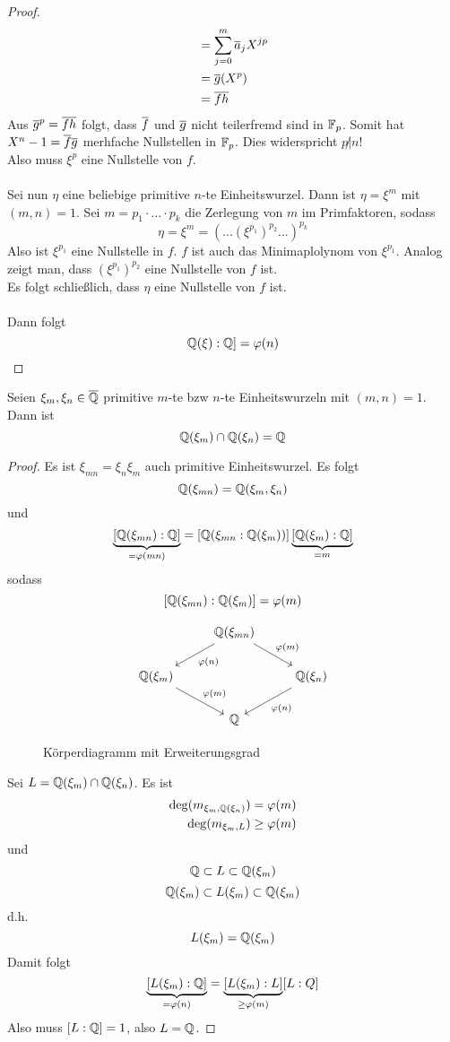 \begin{proof}
\begin{align*}
		&=\sum_{j=0}^{m}\overline{a}_jX^{jp}\\
		&=\overline{g}(X^p)\\
		&=\overline{f}\overline{h}
		\end{align*}
		Aus $\overline{g}^p=\overline{f} \overline{h}$ folgt, dass $\overline{f}$ und $\overline{g}$ nicht teilerfremd sind in $\mathbb{F}_p$. Somit hat $X^n-1=\overline{f}\overline{g}$ merhfache Nullstellen in $\mathbb{F}_p$. Dies widerspricht $p\not|n$!\\
		Also muss $\xi^p$ eine Nullstelle von $f$.\\
		\\
		Sei nun $\eta$ eine beliebige primitive $n$-te Einheitswurzel. Dann ist $\eta=\xi^m$ mit $(m,n)=1$. Sei $m=p_1\cdot...\cdot p_k$ die Zerlegung von $m$ im Primfaktoren, sodass
		\[\eta=\xi^m=(...(\xi^{p_1})^{p_2}...)^{p_k}\]
		Also ist $\xi^{p_1}$ eine Nullstelle in $f$. $f$ ist auch das Minimaplolynom von $\xi^{p_1}$. Analog zeigt man, dass $(\xi^{p_1})^{p_2}$ eine Nullstelle von $f$ ist.\\
		Es folgt schließlich, dass $\eta$ eine Nullstelle von $f$ ist.\\ 
		\\
		Dann folgt
		\[\mathbb{Q}(\xi):\mathbb{Q}]=\varphi(n)\]
	\end{proof}
	
	
	\begin{satz}
		Seien $\xi_m,\xi_n\in\overline{\mathbb{Q}}$ primitive $m$-te bzw $n$-te Einheitswurzeln mit $(m,n)=1$.\\
		Dann ist
		\[\mathbb{Q}(\xi_m)\cap \mathbb{Q}(\xi_n)=\mathbb{Q}\]
	\end{satz}
	\begin{proof}
		Es ist $\xi_{mn}=\xi_n\xi_m$ auch primitive Einheitswurzel. Es folgt
		\[\mathbb{Q}(\xi_{mn})=\mathbb{Q}(\xi_m,\xi_n)\]
		und
		\[\underbrace{[\mathbb{Q}(\xi_{mn}):\mathbb{Q}]}_{=\varphi(mn)}=[\mathbb{Q}(\xi_{mn}:\mathbb{Q}(\xi_m))]\underbrace{[\mathbb{Q}(\xi_m):\mathbb{Q}]}_{=m}\]
		sodass
		\[[\mathbb{Q}(\xi_{mn}):\mathbb{Q}(\xi_m)]=\varphi(m)\]
		\begin{figure}[h]
			\centering
			\[\begin{tikzcd}
				&\Q(\xi_{mn})\ar[dl,"\varphi(n)"]\ar[dr,"\varphi(m)"]&\\
				\Q(\xi_m)\ar[dr,"\varphi(m)"]&&\Q(\xi_n)\ar["\varphi(n)",dl]\\
				&\Q&
			\end{tikzcd}\]
			\caption{Körperdiagramm mit Erweiterungsgrad}
			\label{fig:cdUnitRoot}
		\end{figure}
	
		Sei $L=\mathbb{Q}(\xi_m)\cap\mathbb{Q}(\xi_n)$. Es ist
		\begin{align*}
		\deg(m_{\xi_m,\mathbb{Q}(\xi_n)}&)=\varphi(m)\\
		\deg(m_{\xi_m,L}&)\geq\varphi(m)
		\end{align*}
		und
		\[\mathbb{Q}\subset L\subset \mathbb{Q}(\xi_m)\]
		\[\mathbb{Q}(\xi_m)\subset L(\xi_m)\subset \mathbb{Q}(\xi_m)\]
		d.h.
		\[L(\xi_m)=\mathbb{Q}(\xi_m)\]
		Damit folgt
		\[\underbrace{[L(\xi_m):\mathbb{Q}]}_{=\varphi(n)}=\underbrace{[L(\xi_m):L]}_{\geq \varphi(m)}[L:Q]\]
		Also muss $[L:\mathbb{Q}]=1$, also $L=\mathbb{Q}$.
	\end{proof}


